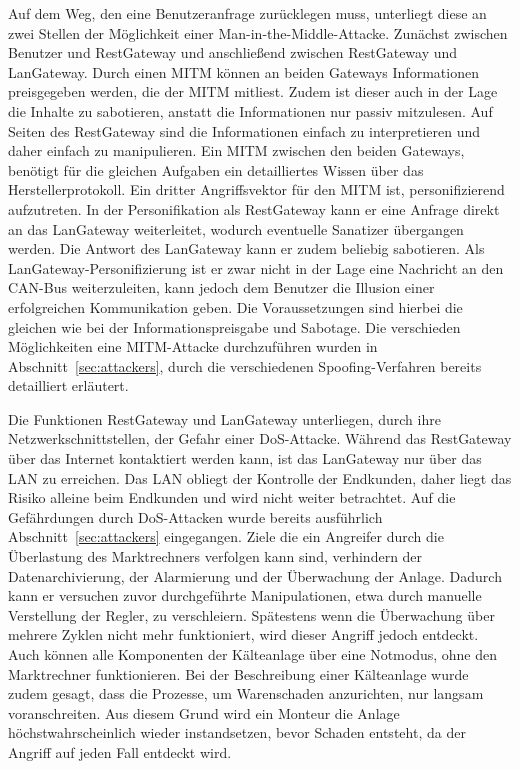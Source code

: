\documentclass[11pt,a4paper]{report}
\begin{document}
Auf dem Weg, den eine Benutzeranfrage zurücklegen muss, unterliegt diese an zwei Stellen der Möglichkeit einer Man-in-the-Middle-Attacke. Zunächst zwischen Benutzer und RestGateway und anschließend zwischen RestGateway und LanGateway. Durch einen MITM können an beiden Gateways Informationen preisgegeben werden, die der MITM mitliest. Zudem ist dieser auch in der Lage die Inhalte zu sabotieren, anstatt die Informationen nur passiv mitzulesen. Auf Seiten des RestGateway sind die Informationen einfach zu interpretieren und daher einfach zu manipulieren. Ein MITM zwischen den beiden Gateways, benötigt für die gleichen Aufgaben ein detailliertes Wissen über das Herstellerprotokoll. Ein dritter Angriffsvektor für den MITM ist, personifizierend aufzutreten. In der Personifikation als RestGateway kann er eine Anfrage direkt an das LanGateway weiterleitet, wodurch eventuelle Sanatizer übergangen werden. Die Antwort des LanGateway kann er zudem beliebig sabotieren. Als LanGateway-Personifizierung ist er zwar nicht in der Lage eine Nachricht an den CAN-Bus weiterzuleiten, kann jedoch dem Benutzer die Illusion einer erfolgreichen Kommunikation geben. Die Voraussetzungen sind hierbei die gleichen wie bei der Informationspreisgabe und Sabotage. Die verschieden Möglichkeiten eine MITM-Attacke durchzuführen wurden in Abschnitt~\ref{sec:attackers}, durch die verschiedenen Spoofing-Verfahren bereits detailliert erläutert.

Die Funktionen RestGateway und LanGateway unterliegen, durch ihre Netzwerkschnittstellen, der Gefahr einer DoS-Attacke. Während das RestGateway über das Internet kontaktiert werden kann, ist das LanGateway nur über das LAN zu erreichen. Das LAN obliegt der Kontrolle der Endkunden, daher liegt das Risiko alleine beim Endkunden und wird nicht weiter betrachtet. Auf die Gefährdungen durch DoS-Attacken wurde bereits ausführlich Abschnitt~\ref{sec:attackers} eingegangen. Ziele die ein Angreifer durch die Überlastung des Marktrechners verfolgen kann sind, verhindern der Datenarchivierung, der Alarmierung und der Überwachung der Anlage. Dadurch kann er versuchen zuvor durchgeführte Manipulationen, etwa durch manuelle Verstellung der Regler, zu verschleiern. Spätestens wenn die Überwachung über mehrere Zyklen nicht mehr funktioniert, wird dieser Angriff jedoch entdeckt. Auch können alle Komponenten der Kälteanlage über eine Notmodus, ohne den Marktrechner funktionieren. Bei der Beschreibung einer Kälteanlage wurde zudem gesagt, dass die Prozesse, um Warenschaden anzurichten, nur langsam voranschreiten. Aus diesem Grund wird ein Monteur die Anlage höchstwahrscheinlich wieder instandsetzen, bevor Schaden entsteht, da der Angriff auf jeden Fall entdeckt wird.
\end{document}

